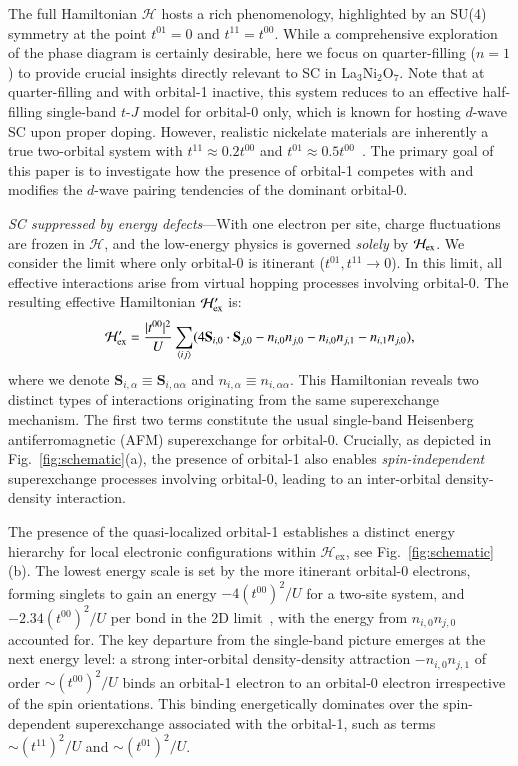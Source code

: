 \documentclass[reprint,superscriptaddress,amsmath,amssymb,aps,twocolumn]{revtex4-1}
\begin{document}
The full Hamiltonian $\mathcal{H}$ hosts a rich phenomenology, highlighted by an SU(4) symmetry at the point $t^{01}=0$ and $t^{11}=t^{00}$. While a comprehensive exploration of the phase diagram is certainly desirable, here we focus on quarter-filling ($n=1$) to provide crucial insights directly relevant to SC in La$_3$Ni$_2$O$_7$. Note that at quarter-filling and with orbital-1 inactive, this system reduces to an effective half-filling single-band $t$-$J$ model for orbital-0 only, which is known for hosting $d$-wave SC upon proper doping. However, realistic nickelate materials are inherently a true two-orbital system with  $t^{11} \approx 0.2 t^{00}$ and $t^{01} \approx 0.5 t^{00}$~\cite{2025Jiang}. The primary goal of this paper is to investigate how the presence of orbital-1 competes with and modifies the $d$-wave pairing tendencies of the dominant orbital-0.

{\color{blue} \em  SC suppressed by energy defects}---With one electron per site, charge fluctuations are frozen in $\mathcal{H}$, and the low-energy physics is governed {\em solely} by $\mathcal{H}_{\rm ex}$. We consider the limit where only orbital-$0$ is itinerant ($t^{01}, t^{11} \rightarrow 0$). 
In this limit, all effective interactions arise from virtual hopping processes involving orbital-0. The resulting effective Hamiltonian $\mathcal{H}_{\rm ex}'$ is:
\begin{equation}
\mathcal{H}_{\rm ex}' = \frac{|t^{00}|^2}{U} \sum_{\langle ij \rangle} (4\mathbf{S}_{i,0} \cdot \mathbf{S}_{j,0} -n_{i,0} n_{j,0} - n_{i,0} n_{j,1} - n_{i,1}n_{j,0}),
\label{eq:Hex0}
\end{equation}
where we denote $\mathbf{S}_{i,\alpha} \equiv \mathbf{S}_{i,\alpha\alpha}$ and $n_{i,\alpha} \equiv n_{i,\alpha\alpha}$. This Hamiltonian reveals two distinct types of interactions originating from the same superexchange mechanism. The first two terms constitute the usual single-band Heisenberg antiferromagnetic (AFM) superexchange for orbital-0. Crucially, as depicted in Fig.~\ref{fig:schematic}(a), the presence of orbital-1 also enables {\em spin-independent} superexchange processes involving orbital-0, leading to an inter-orbital density-density interaction. 

The presence of the quasi-localized orbital-1 establishes a distinct energy hierarchy for local electronic configurations within  $\mathcal{H}_{\text{ex}}$, see Fig.~\ref{fig:schematic}(b). The lowest energy scale is set by the more itinerant orbital-0 electrons, forming singlets to gain an energy $-4(t^{00})^2/U$ for a two-site system, and $-2.34(t^{00})^2/U$ per bond in the 2D limit~\cite{Sandvik1997}, with the energy from $n_{i,0}n_{j,0}$ accounted for. The key departure from the single-band picture emerges at the next energy level: a strong inter-orbital density-density attraction $-n_{i,0} n_{j,1}$ of order $\sim(t^{00})^2/U$ binds an orbital-1 electron to an orbital-0 electron irrespective of the spin orientations. This binding energetically dominates over the spin-dependent superexchange associated with the orbital-1, such as terms $\sim (t^{11})^2/U$ and $\sim (t^{01})^2/U$. 
\end{document}
